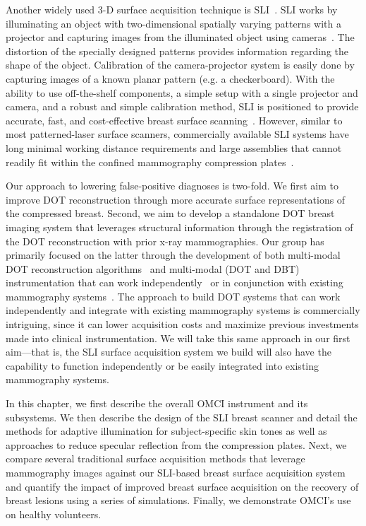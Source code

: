 Another widely used 3-D surface acquisition technique is \ac{SLI}~\cite{Yang2020, Zhang2018}. \ac{SLI} works by illuminating an object with two-dimensional spatially varying patterns with a projector and capturing images from the illuminated object using cameras~\cite{Geng2011}. The distortion of the specially designed patterns provides information regarding the shape of the object. Calibration of the camera-projector system is easily done by capturing images of a known planar pattern (e.g. a checkerboard). With the ability to use off-the-shelf components, a simple setup with a single projector and camera, and a robust and simple calibration method, \ac{SLI} is positioned to provide accurate, fast, and cost-effective breast surface scanning~\cite{Yang2020}. However, similar to most patterned-laser surface scanners, commercially available \ac{SLI} systems have long minimal working distance requirements and large assemblies that cannot readily fit within the confined mammography compression plates~\cite{Zhang2018, Rodriguez2017}.

Our approach to lowering false-positive diagnoses is two-fold. We first aim to improve \ac{DOT} reconstruction through more accurate surface representations of the compressed breast. Second, we aim to develop a standalone \ac{DOT} breast imaging system that leverages structural information through the registration of the \ac{DOT} reconstruction with prior x-ray mammographies. Our group has primarily focused on the latter through the development of both multi-modal \ac{DOT} reconstruction algorithms~\cite{Deng2015} and multi-modal (\ac{DOT} and \ac{DBT}) instrumentation that can work independently~\cite{Carp2006,Carp2008,Carp2013} or in conjunction with existing mammography systems~\cite{Fang2009,Zimmermann2017}. The approach to build \ac{DOT} systems that can work independently and integrate with existing mammography systems is commercially intriguing, since it can lower acquisition costs and maximize previous investments made into clinical instrumentation. We will take this same approach in our first aim---that is, the \ac{SLI} surface acquisition system we build will also have the capability to function independently or be easily integrated into existing mammography systems. 

In this chapter, we first describe the overall \ac{OMCI} instrument and its subsystems. We then describe the design of the \ac{SLI} breast scanner and detail the methods for adaptive illumination for subject-specific skin tones as well as approaches to reduce specular reflection from the compression plates. Next, we compare several traditional surface acquisition methods that leverage mammography images against our \ac{SLI}-based breast surface acquisition system and quantify the impact of improved breast surface acquisition on the recovery of breast lesions using a series of simulations. Finally, we demonstrate \ac{OMCI}'s use on healthy volunteers.



